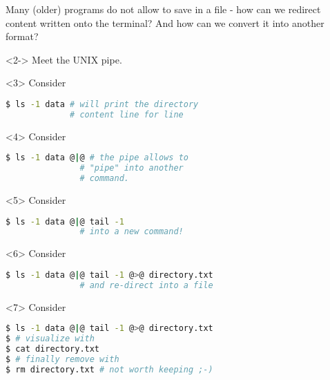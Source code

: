 {
	\begin{frame}[fragile]{}
		\begin{question}
			Many (older) programs do not allow to save in a file - how can we redirect content written onto the terminal?\newline
			And how can we convert it into another format? 
		\end{question}
	    \begin{onlyenv}<2->
		  Meet the UNIX pipe. 
	    \end{onlyenv}
        \begin{onlyenv}<3>
        	Consider
		  \begin{lstlisting}[language=Bash, style=Shell]
$ ls -1 data # will print the directory 
             # content line for line
		  \end{lstlisting}
	    \end{onlyenv}
        \begin{onlyenv}<4>
        	Consider
        	\begin{lstlisting}[language=Bash, style=Shell]
$ ls -1 data @|@ # the pipe allows to
               # "pipe" into another
               # command.
        	\end{lstlisting}
        \end{onlyenv}
        \begin{onlyenv}<5>
        	Consider
        	\begin{lstlisting}[language=Bash, style=Shell]
$ ls -1 data @|@ tail -1
               # into a new command!
        	\end{lstlisting}
        \end{onlyenv}
        \begin{onlyenv}<6>
        	Consider
        	\begin{lstlisting}[language=Bash, style=Shell]
$ ls -1 data @|@ tail -1 @>@ directory.txt
               # and re-direct into a file
        	\end{lstlisting}
        \end{onlyenv}
        \begin{onlyenv}<7>
    	Consider
    	\begin{lstlisting}[language=Bash, style=Shell]
$ ls -1 data @|@ tail -1 @>@ directory.txt
$ # visualize with
$ cat directory.txt
$ # finally remove with
$ rm directory.txt # not worth keeping ;-)
    	\end{lstlisting}
    \end{onlyenv}      
        \vfill
	\end{frame}
}

